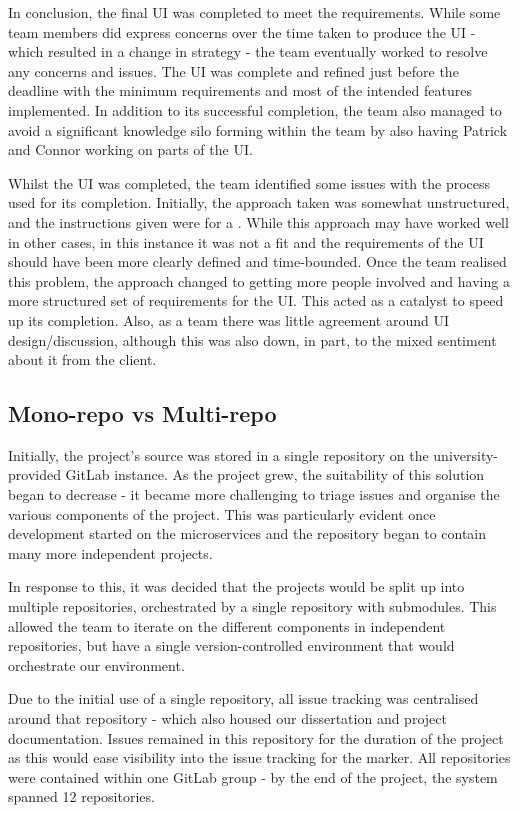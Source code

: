 \documentclass{l3proj}
\begin{document}
In conclusion, the final UI was completed to meet the requirements. While some team members did express concerns over the time taken to produce the UI - which resulted in a change in strategy - the team eventually worked to resolve any concerns and issues. The UI was complete and refined just before the deadline with the minimum requirements and most of the intended features implemented. In addition to its successful completion, the team also managed to avoid a significant knowledge silo forming within the team by also having Patrick and Connor working on parts of the UI.

Whilst the UI was completed, the team identified some issues with the process used for its completion. Initially, the approach taken was somewhat unstructured, and the instructions given were for a . While this approach may have worked well in other cases, in this instance it was not a fit and the requirements of the UI should have been more clearly defined and time-bounded. Once the team realised this problem, the approach changed to getting more people involved and having a more structured set of requirements for the UI. This acted as a catalyst to speed up its completion. Also, as a team there was little agreement around UI design/discussion, although this was also down, in part, to the mixed sentiment about it from the client.

\subsection{Mono-repo vs Multi-repo}
Initially, the project's source was stored in a single repository on the university-provided GitLab instance. As the project grew, the suitability of this solution began to decrease - it became more challenging to triage issues and organise the various components of the project. This was particularly evident once development started on the microservices and the repository began to contain many more independent projects.

In response to this, it was decided that the projects would be split up into multiple repositories, orchestrated by a single  repository with submodules. This allowed the team to iterate on the different components in independent repositories, but have a single version-controlled environment that would orchestrate our  environment.

Due to the initial use of a single repository, all issue tracking was centralised around that repository - which also housed our dissertation and project documentation. Issues remained in this repository for the duration of the project as this would ease visibility into the issue tracking for the marker. All repositories were contained within one GitLab group - by the end of the project, the system spanned 12 repositories.
\end{document}
